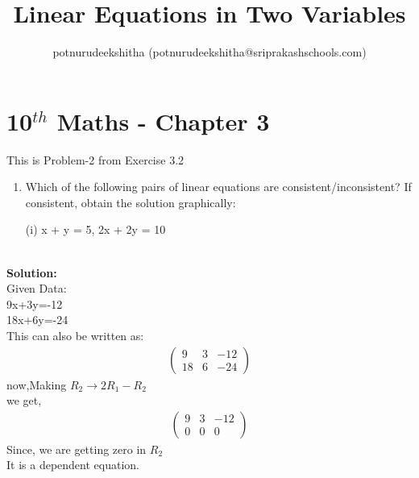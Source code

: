 \documentclass[12pt]{article}
\title{Linear Equations in Two Variables}
\author{potnurudeekshitha (potnurudeekshitha@sriprakashschools.com)}
\newcommand{\myvec}[1]{\ensuremath{\begin{pmatrix}#1\end{pmatrix}}}
\newcommand{\solution}{\noindent \textbf{Solution: }}
\begin{document}
\maketitle
\section*{10$^{th}$ Maths - Chapter 3}
This is Problem-2 from Exercise 3.2
\begin{enumerate}
\item  Which of the following pairs of linear equations are consistent/inconsistent? If consistent, obtain the solution graphically:

(i) x + y = 5, 2x + 2y = 10 \\\\
\end{enumerate}
\solution \\
Given Data:\\
            9x+3y=-12\\ 
            18x+6y=-24\\

This can also be written as:
\begin{align}
\myvec{9&3&-12\\18&6&-24}
\end{align}
now,Making $R_2 \xrightarrow\ 2R_1 - R_2$\\ 
we get,
\begin{align}
\myvec{9&3&-12\\0&0&0}
\end{align}
Since, we are getting zero in $R_2$\\
It is a dependent equation.
\end{document}
